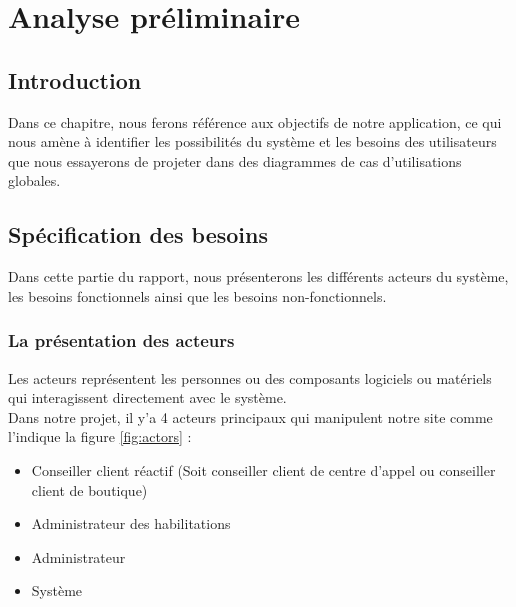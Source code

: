 \chapter{Analyse préliminaire}

\section*{Introduction}
Dans ce chapitre, nous ferons référence aux objectifs de notre application, ce qui nous amène à identifier les possibilités du système et les besoins des utilisateurs que nous essayerons de projeter dans des diagrammes de cas d’utilisations globales.
    
\section[Spécification des besoins]{Spécification des besoins}
Dans cette partie du rapport, nous présenterons les différents acteurs du système, les besoins fonctionnels ainsi que les besoins non-fonctionnels.
\subsection[La présentation des acteurs ]{La présentation des acteurs }
Les acteurs représentent les personnes ou des composants logiciels ou matériels qui interagissent directement avec le système.\\
Dans notre projet, il y’a 4 acteurs principaux qui manipulent notre site comme l'indique la figure \ref{fig:actors} :
\begin{itemize}
	\item Conseiller client réactif (Soit conseiller client de centre d’appel ou conseiller client de boutique)
	\item Administrateur des habilitations
	\item Administrateur
	\item Système
\end{itemize}


